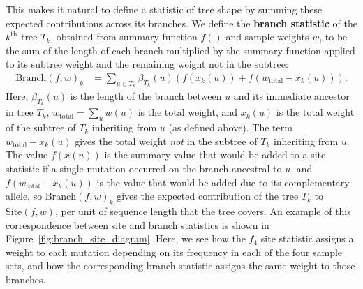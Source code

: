 \documentclass{article}
\newcommand{\branch}{\mbox{Branch}} %
\newcommand{\site}{\mbox{Site}} %
\newcommand{\iw}{w} %
\newcommand{\tiw}{w_\text{total}} %
\newcommand{\nw}{x} %
\begin{document}
This makes it natural to define
a statistic of tree shape by summing these expected contributions across its branches.
We define the \textbf{branch statistic} of the $k^\text{th}$ tree $T_k$,
obtained from summary function $f()$ and sample weights $\iw$,
to be the sum of the length of each branch
multiplied by the summary function applied to its subtree weight
and the remaining weight not in the subtree:
\begin{align}\label{eqn:branch_stat_tree}
    \branch(f, \iw)_k
    &=
    \sum_{u \in T_k} \beta_{T_k}(u) \left( f(\nw_{k}(u)) + f(\tiw - \nw_{k}(u)) \right)  .
\end{align}
Here, $\beta_{T_k}(u)$ is the length of the branch between $u$ and its immediate ancestor in tree $T_k$,
$\tiw = \sum_u \iw(u)$ is the total weight,
and $\nw_{k}(u)$ is the total weight of the subtree of $T_k$ inheriting from $u$ (as defined above).
The term $\tiw - \nw_{k}(u)$ gives the total weight \emph{not} in the subtree of $T_k$ inheriting from $u$.
The value $f(\nw(u))$ is the summary value that would be added to a site statistic
if a single mutation occurred on the branch ancestral to $u$,
and $f(\tiw - \nw_{k}(u))$ is the value that would be added due to its complementary allele,
so $\branch(f, \iw)_k$ gives the expected contribution of the tree $T_k$ to $\site(f, \iw)$,
per unit of sequence length that the tree covers.
An example of this correspondence between site and branch statistics
is shown in Figure~\ref{fig:branch_site_diagram}. Here, we
see how the $f_4$ site statistic assigns a weight to each mutation
depending on its frequency in each of the four sample sets,
and how the corresponding branch statistic assigns the same weight to those branches.
\end{document}
